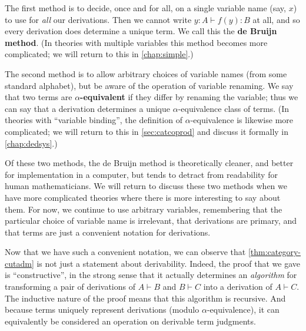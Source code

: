 \documentclass{book}
\let\types\vdash
\begin{document}
The first method is to decide, once and for all, on a single variable name (say, $x$) to use for \emph{all} our derivations.
Then we cannot write $y:A \types f(y):B$ at all, and so every derivation does determine a unique term.
We call this the \textbf{de Bruijn method}.
(In theories with multiple variables this method becomes more complicated; we will return to this in \cref{chap:simple}.)

The second method is to allow arbitrary choices of variable names (from some standard alphabet), but be aware of the operation of variable renaming.
We say that two terms are \textbf{$\alpha$-equivalent} if they differ by renaming the variable; thus we can say that a derivation determines a unique $\alpha$-equivalence class of terms.
(In theories with ``variable binding'', the definition of $\alpha$-equivalence is likewise more complicated; we will return to this in \cref{sec:catcoprod} and discuss it formally in \cref{chap:dedsys}.)

Of these two methods, the de Bruijn method is theoretically cleaner, and better for implementation in a computer, but tends to detract from readability for human mathematicians.
We will return to discuss these two methods when we have more complicated theories where there is more interesting to say about them.
For now, we continue to use arbitrary variables, remembering that the particular choice of variable name is irrelevant, that derivations are primary, and that terms are just a convenient notation for derivations.

Now that we have such a convenient notation, we can observe that \cref{thm:category-cutadm} is not just a statement about derivability.
Indeed, the proof that we gave is ``constructive'', in the strong sense that it actually determines an \emph{algorithm} for transforming a pair of derivations of $A\types B$ and $B\types C$ into a derivation of $A\types C$.
The inductive nature of the proof means that this algorithm is recursive.
And because terms uniquely represent derivations (modulo $\alpha$-equivalence), it can equivalently be considered an operation on derivable term judgments.
\end{document}
